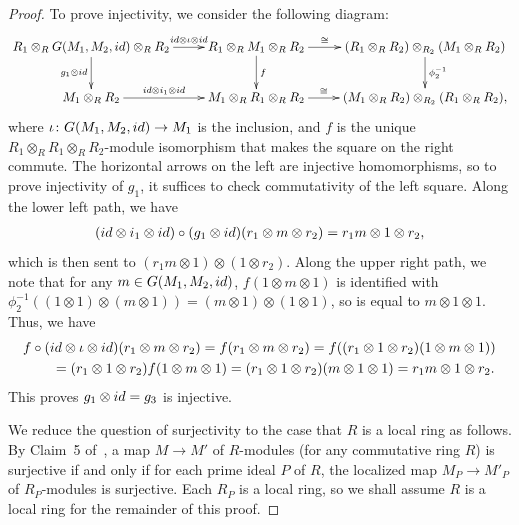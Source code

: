 \documentclass[11pt]{article}
\theoremstyle{definition}
\begin{document}
\begin{proof}
To prove injectivity, we consider the following diagram:
\begin{gather*} \xymatrix{ R_1 \otimes_{R} G(M_1, M_2,{\rm id}) \otimes_{R} R_2 \ar[r]^-{{\rm id} \otimes \iota \otimes {\rm id}} \ar[d]_{g_1 \otimes {\rm id}} & R_1 \otimes_{R} M_1 \otimes_{R} R_2 \ar[r]^-{\cong} \ar[d]^{f} & (R_1 \otimes_{R} R_2) \otimes_{R_2} (M_1 \otimes_{R} R_2) \ar[d]^{\phi_2^{-1}} \\
M_1 \otimes_{R} R_2 \ar[r]^-{{\rm id} \otimes i_1 \otimes {\rm id}} & M_1 \otimes_{R} R_1 \otimes_{R} R_2 \ar[r]^-{\cong} & (M_1 \otimes_{R} R_2) \otimes_{R_2} (R_1 \otimes_{R} R_2), } \end{gather*}
where $\iota\colon G(M_1, M_2,{\rm id}) \to M_1$ is the inclusion, and $f$ is the unique $R_1 \otimes_{R} R_1 \otimes_{R} R_2$-module isomorphism that makes the square on the right commute. The horizontal arrows on the left are injective homomorphisms, so to prove injectivity of $g_1$, it suffices to check commutativity of the left square. Along the lower left path, we have
\begin{gather*} ({\rm id} \otimes i_1 \otimes {\rm id}) \circ (g_1 \otimes {\rm id})(r_1 \otimes m \otimes r_2) = r_1m \otimes 1 \otimes r_2, \end{gather*}
which is then sent to $(r_1m \otimes 1) \otimes (1 \otimes r_2)$. Along the upper right path, we note that for any $m \in G(M_1, M_2,{\rm id})$, $f(1 \otimes m \otimes 1)$ is identified with $\phi_2^{-1}((1 \otimes 1) \otimes (m \otimes 1)) = (m \otimes 1) \otimes (1 \otimes 1)$, so is equal to $m \otimes 1 \otimes 1$. Thus, we have{\samepage
\begin{gather*}
f \circ ({\rm id} \otimes \iota \otimes {\rm id})(r_1 \otimes m \otimes r_2) = f(r_1 \otimes m \otimes r_2)= f((r_1 \otimes 1 \otimes r_2)(1 \otimes m \otimes 1)) \\
\qquad{} = (r_1 \otimes 1 \otimes r_2) f(1 \otimes m \otimes 1) = (r_1 \otimes 1 \otimes r_2) (m \otimes 1 \otimes 1)
 = r_1 m \otimes 1 \otimes r_2.
\end{gather*}
This proves $g_1 \otimes {\rm id} = g_3$ is injective.}

We reduce the question of surjectivity to the case that $R$ is a local ring as follows. By Claim~5 of~\cite[\href{https://stacks.math.columbia.edu/tag/00HN}{Lemma 00HN}]{Stacks}, a map $M \to M'$ of $R$-modules (for any commutative ring $R$) is surjective if and only if for each prime ideal $P$ of $R$, the localized map $M_P \to M'_P$ of $R_P$-modules is surjective. Each $R_P$ is a local ring, so we shall assume $R$ is a local ring for the remainder of this proof.


\end{proof}
\end{document}
